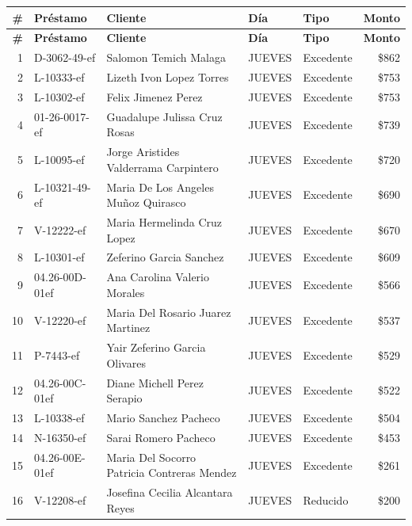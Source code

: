 \documentclass[11pt,a4paper]{article}
\newcommand{\money}[1]{\$\num{#1}}
\begin{document}
\begin{center}
\renewcommand{\arraystretch}{1.1}
\footnotesize
\begin{longtable}{rlp{5.5cm}llr}
\toprule
\textbf{\#} & \textbf{Pr\'estamo} & \textbf{Cliente} & \textbf{D\'ia} & \textbf{Tipo} & \textbf{Monto} \\
\midrule
\endfirsthead
\toprule
\textbf{\#} & \textbf{Pr\'estamo} & \textbf{Cliente} & \textbf{D\'ia} & \textbf{Tipo} & \textbf{Monto} \\
\midrule
\endhead
1 & D-3062-49-ef & Salomon Temich Malaga & JUEVES & Excedente & \money{862} \\
2 & L-10333-ef & Lizeth Ivon Lopez Torres & JUEVES & Excedente & \money{753} \\
3 & L-10302-ef & Felix Jimenez Perez & JUEVES & Excedente & \money{753} \\
4 & 01-26-0017-ef & Guadalupe Julissa Cruz Rosas & JUEVES & Excedente & \money{739} \\
5 & L-10095-ef & Jorge Aristides Valderrama Carpintero & JUEVES & Excedente & \money{720} \\
6 & L-10321-49-ef & Maria De Los Angeles Muñoz Quirasco & JUEVES & Excedente & \money{690} \\
7 & V-12222-ef & Maria Hermelinda Cruz Lopez & JUEVES & Excedente & \money{670} \\
8 & L-10301-ef & Zeferino Garcia Sanchez & JUEVES & Excedente & \money{609} \\
9 & 04.26-00D-01ef & Ana Carolina Valerio Morales & JUEVES & Excedente & \money{566} \\
10 & V-12220-ef & Maria Del Rosario Juarez Martinez & JUEVES & Excedente & \money{537} \\
11 & P-7443-ef & Yair Zeferino Garcia Olivares & JUEVES & Excedente & \money{529} \\
12 & 04.26-00C-01ef & Diane Michell Perez Serapio & JUEVES & Excedente & \money{522} \\
13 & L-10338-ef & Mario Sanchez Pacheco & JUEVES & Excedente & \money{504} \\
14 & N-16350-ef & Sarai Romero Pacheco & JUEVES & Excedente & \money{453} \\
15 & 04.26-00E-01ef & Maria Del Socorro Patricia Contreras Mendez & JUEVES & Excedente & \money{261} \\
16 & V-12208-ef & Josefina Cecilia Alcantara Reyes & JUEVES & Reducido & \money{200} \\

\bottomrule
\end{longtable}
\end{center}
\end{document}

